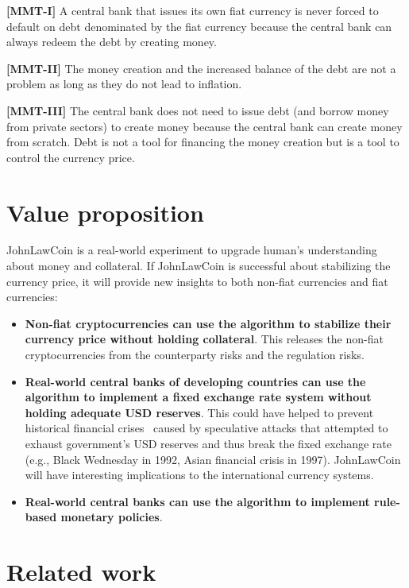 \documentclass[dvipdfmx,a4paper]{article}
\begin{document}
\begin{description}
\item{\textbf{[MMT-I]}} A central bank that issues its own fiat currency is never forced to default on debt denominated by the fiat currency because the central bank can always redeem the debt by creating money.
\item{\textbf{[MMT-II]}} The money creation and the increased balance of the debt are not a problem as long as they do not lead to inflation.
\item{\textbf{[MMT-III]}} The central bank does not need to issue debt (and borrow money from private sectors) to create money because the central bank can create money from scratch. Debt is not a tool for financing the money creation but is a tool to control the currency price.
\end{description}

\section{Value proposition}

JohnLawCoin is a real-world experiment to upgrade human's understanding about money and collateral. If JohnLawCoin is successful about stabilizing the currency price, it will provide new insights to both non-fiat currencies and fiat currencies:

\begin{itemize}
\item \textbf{Non-fiat cryptocurrencies can use the algorithm to stabilize their currency price without holding collateral}. This releases the non-fiat cryptocurrencies from the counterparty risks and the regulation risks.
\item \textbf{Real-world central banks of developing countries can use the algorithm to implement a fixed exchange rate system without holding adequate USD reserves}. This could have helped to prevent historical financial crises~\cite{ferguson2008ascent} caused by speculative attacks that attempted to exhaust government's USD reserves and thus break the fixed exchange rate (e.g., Black Wednesday in 1992, Asian financial crisis in 1997). JohnLawCoin will have interesting implications to the international currency systems.
\item \textbf{Real-world central banks can use the algorithm to implement rule-based monetary policies}.
\end{itemize}

\section{Related work}
\end{document}
